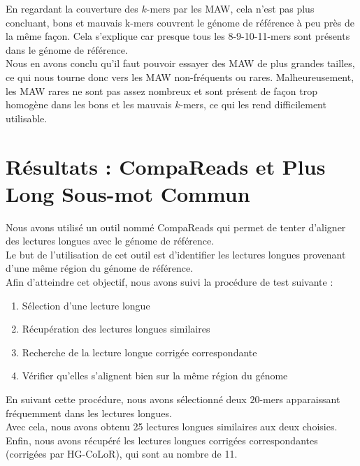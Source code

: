 \documentclass{report}
\begin{document}
      En regardant la couverture des $k$-mers par les MAW, cela n'est pas plus concluant, bons et mauvais k-mers couvrent le génome de référence à peu près de la même façon. Cela s'explique car presque tous les 8-9-10-11-mers sont présents dans le génome de référence.\\

      Nous en avons conclu qu'il faut pouvoir essayer des MAW de plus grandes tailles, ce qui nous tourne donc vers les MAW non-fréquents ou rares. Malheureusement, les MAW rares ne sont pas assez nombreux et sont présent de façon trop homogène dans les bons et les mauvais $k$-mers, ce qui les rend difficilement utilisable.

    \section{Résultats : CompaReads et Plus Long Sous-mot Commun}
      Nous avons utilisé un outil nommé CompaReads\cite{CompaReads2012} qui permet de tenter d'aligner des lectures longues avec le génome de référence.\\

      Le but de l'utilisation de cet outil est d'identifier les lectures longues provenant d'une même région du génome de référence.\\

      Afin d'atteindre cet objectif, nous avons suivi la procédure de test suivante :
      \begin{enumerate}
        \item Sélection d'une lecture longue
        \item Récupération des lectures longues similaires
        \item Recherche de la lecture longue corrigée correspondante
        \item Vérifier qu'elles s'alignent bien sur la même région du génome
      \end{enumerate}\bigskip
      En suivant cette procédure, nous avons sélectionné deux $20$-mers apparaissant fréquemment dans les lectures longues.\\

      Avec cela, nous avons obtenu 25 lectures longues similaires aux deux choisies.\\

      Enfin, nous avons récupéré les lectures longues corrigées correspondantes (corrigées par HG-CoLoR\cite{Morisse2017}), qui sont au nombre de 11.\\
\end{document}
